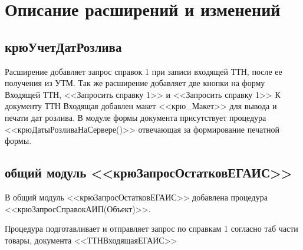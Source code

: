 \section{Описание расширений и изменений}
\subsection{крюУчетДатРозлива}
Расширение добавляет запрос справок 1 при записи входящей ТТН, после ее получения из УТМ. Так же расширение добавляет две кнопки на форму Входящей ТТН, <<Запросить справку 1>> и <<Запросить справку 1>> К документу ТТН Входящая добавлен макет <<крю\_Макет>> для вывода и печати дат розлива. В модуле формы документа присутствует процедура <<крюДатыРозливаНаСервере()>> отвечающая за формирование печатной формы.

\subsection{общий модуль <<крюЗапросОстатковЕГАИС>>}

В общий модуль <<крюЗапросОстатковЕГАИС>> добавлена процедура <<крюЗапросСправокАИП(Объект)>>.

Процедура подготавливает и отправляет запрос по справкам 1 согласно таб части товары, документа <<ТТНВходящаяЕГАИС>>